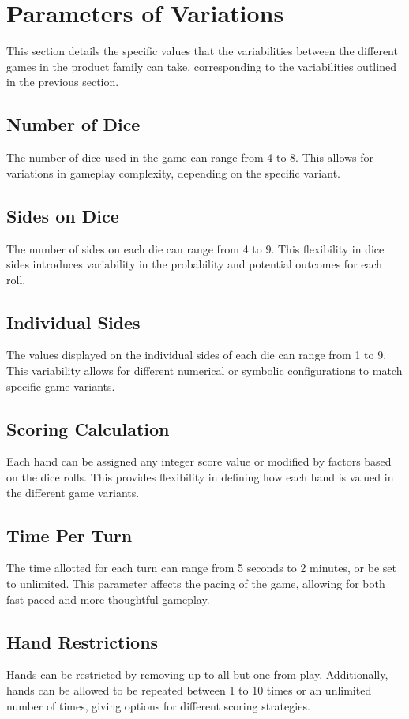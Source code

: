 \section{Parameters of Variations}

This section details the specific values that the variabilities between the different games in the product family can take, corresponding to the variabilities outlined in the previous section.

\subsection{Number of Dice}
The number of dice used in the game can range from 4 to 8. This allows for variations in gameplay complexity, depending on the specific variant.

\subsection{Sides on Dice}
The number of sides on each die can range from 4 to 9. This flexibility in dice sides introduces variability in the probability and potential outcomes for each roll.

\subsection{Individual Sides}
The values displayed on the individual sides of each die can range from 1 to 9. This variability allows for different numerical or symbolic configurations to match specific game variants.

\subsection{Scoring Calculation}
Each hand can be assigned any integer score value or modified by factors based on the dice rolls. This provides flexibility in defining how each hand is valued in the different game variants.

\subsection{Time Per Turn}
The time allotted for each turn can range from 5 seconds to 2 minutes, or be set to unlimited. This parameter affects the pacing of the game, allowing for both fast-paced and more thoughtful gameplay.

\subsection{Hand Restrictions}
Hands can be restricted by removing up to all but one from play. Additionally, hands can be allowed to be repeated between 1 to 10 times or an unlimited number of times, giving options for different scoring strategies.

